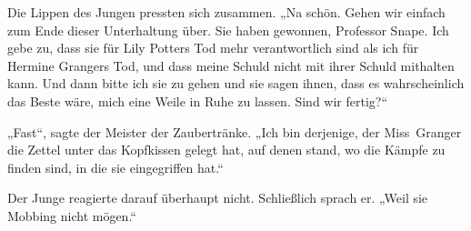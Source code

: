 Die Lippen des Jungen pressten sich zusammen.
„Na schön. Gehen wir einfach zum Ende dieser Unterhaltung über. Sie haben gewonnen, Professor Snape. Ich gebe zu, dass sie für Lily Potters Tod mehr verantwortlich sind als ich für Hermine Grangers Tod, und dass meine Schuld nicht mit ihrer Schuld mithalten kann. Und dann bitte ich sie zu gehen und sie sagen ihnen, dass es wahrscheinlich das Beste wäre, mich eine Weile in Ruhe zu lassen. Sind wir fertig?“

„Fast“, sagte der Meister der Zaubertränke.
„Ich bin derjenige, der Miss~Granger die Zettel unter das Kopfkissen gelegt hat, auf denen stand, wo die Kämpfe zu finden sind, in die sie eingegriffen hat.“

Der Junge reagierte darauf überhaupt nicht. Schließlich sprach er.
„Weil sie Mobbing nicht mögen.“

